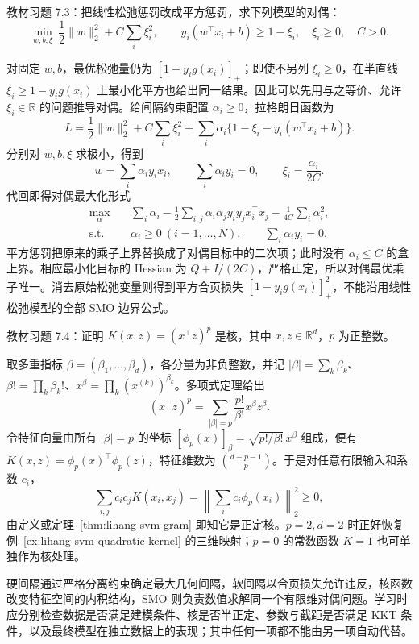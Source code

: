 \begin{example}
\label{ex:lihang-svm-squared-slack}
教材习题 7.3：把线性松弛惩罚改成平方惩罚，求下列模型的对偶：
\begin{equation}
  \min_{w,b,\xi}\ \frac12\lVert w\rVert_2^2+C\sum_i\xi_i^2,
  \qquad y_i(w^\top x_i+b)\ge1-\xi_i,
  \quad\xi_i\ge0,\quad C>0.
  \label{eq:lihang-svm-squared-primal}
\end{equation}
\end{example}
\begin{solve}
对固定 $w,b$，最优松弛量仍为 $[1-y_i g(x_i)]_+$；即使不另列 $\xi_i\ge0$，在半直线 $\xi_i\ge1-y_i g(x_i)$ 上最小化平方也给出同一结果。因此可以先用与之等价、允许 $\xi_i\in\mathbb R$ 的问题推导对偶。给间隔约束配置 $\alpha_i\ge0$，拉格朗日函数为
\[
  L=\frac12\lVert w\rVert_2^2+C\sum_i\xi_i^2
     +\sum_i\alpha_i\{1-\xi_i-y_i(w^\top x_i+b)\}.
\]
分别对 $w,b,\xi$ 求极小，得到
\[
  w=\sum_i\alpha_i y_i x_i,
  \qquad\sum_i\alpha_i y_i=0,
  \qquad\xi_i=\frac{\alpha_i}{2C}.
\]
代回即得对偶最大化形式
\begin{equation}
  \begin{aligned}
    \max_\alpha\quad
      &\sum_i\alpha_i
        -\frac12\sum_{i,j}\alpha_i\alpha_j y_i y_j x_i^\top x_j
        -\frac1{4C}\sum_i\alpha_i^2,\\
    \text{s.t.}\quad
      &\alpha_i\ge0\ (i=1,\ldots,N),\qquad
       \sum_i\alpha_i y_i=0.
  \end{aligned}
  \label{eq:lihang-svm-squared-dual}
\end{equation}
平方惩罚把原来的乘子上界替换成了对偶目标中的二次项；此时没有 $\alpha_i\le C$ 的盒上界。相应最小化目标的 Hessian 为 $Q+I/(2C)$，严格正定，所以对偶最优乘子唯一。消去原始松弛变量则得到平方合页损失 $[1-y_i g(x_i)]_+^2$，不能沿用线性松弛模型的全部 SMO 边界公式。
\end{solve}

\begin{example}
\label{ex:lihang-svm-power-kernel}
教材习题 7.4：证明 $K(x,z)=(x^\top z)^p$ 是核，其中 $x,z\in\mathbb R^d$，$p$ 为正整数。
\end{example}
\begin{solve}
取多重指标 $\beta=(\beta_1,\ldots,\beta_d)$，各分量为非负整数，并记 $|\beta|=\sum_k\beta_k$、$\beta!=\prod_k\beta_k!$、$x^\beta=\prod_k(x^{(k)})^{\beta_k}$。多项式定理给出
\[
  (x^\top z)^p
    =\sum_{|\beta|=p}\frac{p!}{\beta!}x^\beta z^\beta.
\]
令特征向量由所有 $|\beta|=p$ 的坐标 $[\phi_p(x)]_\beta=\sqrt{p!/\beta!}\,x^\beta$ 组成，便有 $K(x,z)=\phi_p(x)^\top\phi_p(z)$，特征维数为 $\binom{d+p-1}{p}$。于是对任意有限输入和系数 $c_i$，
\[
  \sum_{i,j}c_i c_jK(x_i,x_j)
    =\left\lVert\sum_i c_i\phi_p(x_i)\right\rVert_2^2\ge0,
\]
由定义或定理~\ref{thm:lihang-svm-gram} 即知它是正定核。$p=2,d=2$ 时正好恢复例~\ref{ex:lihang-svm-quadratic-kernel} 的三维映射；$p=0$ 的常数函数 $K=1$ 也可单独作为核处理。
\end{solve}

硬间隔通过严格分离约束确定最大几何间隔，软间隔以合页损失允许违反，核函数改变特征空间的内积结构，SMO 则负责数值求解同一个有限维对偶问题。学习时应分别检查数据是否满足建模条件、核是否半正定、参数与截距是否满足 KKT 条件，以及最终模型在独立数据上的表现；其中任何一项都不能由另一项自动代替。





